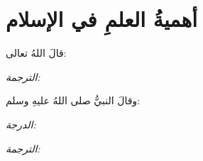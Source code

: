 \documentclass[12pt,a4paper]{article}
\begin{document}
\section{أهميةُ العلمِ في الإسلام}

قالَ اللهُ تعالى:

\begin{quote}
\quranayah[96][1][5]
\end{quote}

\par\noindent
\textit{الترجمة:} \quranayahen[96][1][5]

\bigskip

وقالَ النبيُّ صلى اللهُ عليهِ وسلم:

\begin{quote}
\hadith[bukhari][71]
\end{quote}

\par\noindent
\textit{الدرجة:} \hadithgrade[bukhari][71]
\par
\textit{الترجمة:} \hadithtrans[bukhari][71]
\end{document}
